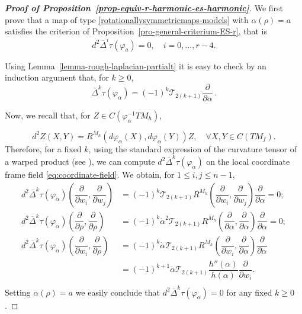 \documentclass[11pt]{amsart}
\theoremstyle{plain}
\theoremstyle{definition}
\numberwithin{equation}{section}
\numberwithin{equation}{section}
\begin{document}
\begin{proof}[{\bf Proof of Proposition~\ref{prop-equiv-r-harmonic-es-harmonic}}]
We first prove that a map of type \eqref{rotationallysymmetricmaps-models} with $\alpha(\rho)=a$ satisfies the criterion of Proposition~\ref{pro-general-criterium-ES-r}, that is
\[
d^2\overline{\Delta}^i\tau(\varphi_{a}) = 0, \quad i=0,\dots,r-4.
\]

Using Lemma~\ref{lemma-rough-laplacian-partialt} it is easy to check by an induction argument that, for $k\geq 0$,
\begin{equation}\label{eq:deltaktau}
\overline{\Delta}^k \tau(\varphi_{\alpha}) = (-1)^k\mathcal{T}_{2(k+1)} \dfrac{\partial}{\partial \alpha}\,.
\end{equation}

Now, we recall that, for $Z \in C(\varphi_{\alpha}^{-1}TM_h)$,

\begin{equation}\label{eq:d2Z}
d^2 Z (X, Y) = R^{M_h}(d\varphi_{\alpha}(X),d\varphi_{\alpha}(Y))Z, \quad \forall X, Y \in C(TM_f).
\end{equation}
Therefore, for a fixed  $k$, using the standard expression of the curvature tensor of a warped product (see \cite[Chapter~7, Proposition~42]{Oneill}), we can compute $d^2 \overline{\Delta}^k \tau(\varphi_{\alpha})$ on the local coordinate frame field \eqref{eq:coordinate-field}.
We obtain, for $1\leq i,j\leq n-1$, 
\begin{equation}\label{eq:d2deltaktau}
\begin{split}
	d^2 \overline{\Delta}^k \tau(\varphi_{\alpha}) \left(\dfrac{\partial}{\partial w_i}, \dfrac{\partial}{\partial w_j}\right) & = (-1)^k\mathcal{T}_{2(k+1)} R^{M_h}\left(\dfrac{\partial}{\partial w_i}, \dfrac{\partial}{\partial w_j}\right) \dfrac{\partial}{\partial \alpha} = 0;\\
	d^2 \overline{\Delta}^k \tau(\varphi_{\alpha}) \left(\dfrac{\partial}{\partial \rho}, \dfrac{\partial}{\partial \rho} \right) & = (-1)^k \dot{\alpha}^2 \mathcal{T}_{2(k+1)} R^{M_h}\left(\dfrac{\partial}{\partial \alpha}, \dfrac{\partial}{\partial \alpha} \right) \dfrac{\partial}{\partial \alpha} = 0;\\
	d^2 \overline{\Delta}^k \tau(\varphi_{\alpha}) \left(\dfrac{\partial}{\partial w_i}, \dfrac{\partial}{\partial \rho} \right) & = (-1)^k \dot{\alpha} \mathcal{T}_{2(k+1)} R^{M_h}\left(\dfrac{\partial}{\partial w_i}, \dfrac{\partial}{\partial \alpha} \right) \dfrac{\partial}{\partial \alpha} \\ &= (-1)^{k+1} \dot{\alpha} \mathcal{T}_{2(k+1)} \dfrac{h''(\alpha)}{h(\alpha)}\dfrac{\partial}{\partial w_i}.\\
\end{split}
\end{equation}
Setting $\alpha(\rho) = a$ we easily conclude that $d^2 \overline{\Delta}^k \tau(\varphi_{\alpha})=0$ for any fixed $k\geq 0$.


\end{proof}
\end{document}
